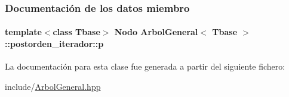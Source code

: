 \subsubsection{Documentación de los datos miembro}
\hypertarget{classArbolGeneral_1_1postorden__iterador_ae269432023776674c7633eadeb8c30e0}{
\paragraph[{p}]{\setlength{\rightskip}{0pt plus 5cm}template$<$class Tbase$>$ {\bf Nodo} {\bf Arbol\-General}$<$ Tbase $>$\-::postorden\-\_\-iterador\-::p\hspace{0.3cm}{\ttfamily [private]}}}\label{classArbolGeneral_1_1postorden__iterador_ae269432023776674c7633eadeb8c30e0}


La documentación para esta clase fue generada a partir del siguiente fichero\-:\begin{DoxyCompactItemize}
\item 
include/\hyperlink{ArbolGeneral_8hpp}{Arbol\-General.\-hpp}\end{DoxyCompactItemize}
